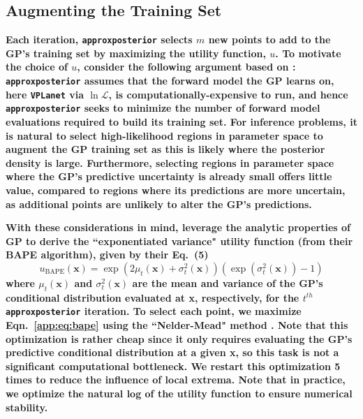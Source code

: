 \documentclass[twocolumn]{aastex62}
\newcommand{\xxx}[1]{{\textbf{#1}}}
\newcommand{\vplanet}[0]{\texttt{VPLanet}\xspace}
\newcommand{\approxposterior}[0]{\texttt{approxposterior}\xspace}
\begin{document}
\subsection{Augmenting the Training Set} \label{app:augment}

\xxx{Each iteration, \approxposterior selects $m$ new points to add to the GP's training set by maximizing the utility function, $u$. To motivate the choice of $u$, consider the following argument based on \citet{Kandasamy2017}: \approxposterior assumes that the forward model the GP learns on, here \vplanet via $\ln \mathcal{L}$, is computationally-expensive to run, and hence \approxposterior seeks to minimize the number of forward model evaluations required to build its training set. For inference problems, it is natural to select high-likelihood regions in parameter space to augment the GP training set as this is likely where the posterior density is large. Furthermore, selecting regions in parameter space where the GP's predictive uncertainty is already small offers little value, compared to regions where its predictions are more uncertain, as additional points are unlikely to alter the GP's predictions.} 

\xxx{With these considerations in mind, \citet{Kandasamy2017} leverage the analytic properties of GP to derive the ``exponentiated variance" utility function (from their BAPE algorithm), given by their Eq.~(5)}
\begin{equation} \label{app:eq:bape}
    u_{\textrm{BAPE}}(\textbf{x}) = \exp(2 \mu_t(\textbf{x}) + \sigma_t^2(\textbf{x}))(\exp(\sigma_t^2(\textbf{x})) - 1)
\end{equation}
\xxx{where $\mu_t(\textbf{x})$ and $\sigma_t^2(\textbf{x})$ are the mean and variance of the GP's conditional distribution evaluated at \textbf{x}, respectively, for the $t^{th}$ \approxposterior iteration. To select each point, we maximize Eqn.~\ref{app:eq:bape} using the ``Nelder-Mead" method \citep{Nelder1965}. Note that this optimization is rather cheap since it only requires evaluating the GP's predictive conditional distribution at a given \textbf{x}, so this task is not a significant computational bottleneck. We restart this optimization 5 times to reduce the influence of local extrema. Note that in practice, we optimize the natural log of the utility function to ensure numerical stability.}
\end{document}
